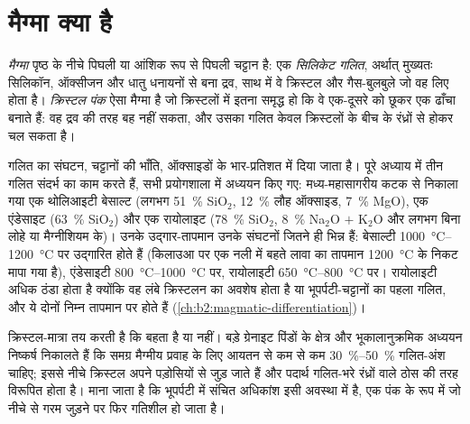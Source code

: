 \section{मैग्मा क्या है}

\begin{definition}[मैग्मा]\label{def:b2:magma-emplacement:magma}
\emph{मैग्मा} पृष्ठ के नीचे पिघली या आंशिक रूप से पिघली चट्टान है: एक
\emph{सिलिकेट गलित}, अर्थात् मुख्यतः सिलिकॉन,
ऑक्सीजन और धातु धनायनों से बना द्रव, साथ में वे क्रिस्टल और गैस-बुलबुले जो वह लिए होता है।
\emph{क्रिस्टल पंक} ऐसा मैग्मा है जो क्रिस्टलों में इतना समृद्ध हो कि वे
एक-दूसरे को छूकर एक ढाँचा बनाते हैं: वह द्रव की तरह बह नहीं सकता, और उसका गलित केवल
क्रिस्टलों के बीच के रंध्रों से होकर चल सकता है।
\end{definition}

गलित का संघटन, चट्टानों की भाँति, ऑक्साइडों के भार-प्रतिशत में दिया जाता है।
पूरे अध्याय में तीन गलित संदर्भ का काम करते हैं, सभी
प्रयोगशाला में अध्ययन किए गए: मध्य-महासागरीय कटक से निकाला गया एक थोलिआइटी बेसाल्ट
(लगभग \qty{51}{\percent} SiO$_2$, \qty{12}{\percent} लौह ऑक्साइड, \qty{7}{\percent}
MgO), एक एंडेसाइट (\qty{63}{\percent} SiO$_2$) और एक रायोलाइट (\qty{78}{\percent}
SiO$_2$, \qty{8}{\percent} Na$_2$O $+$ K$_2$O और लगभग बिना लोहे या मैग्नीशियम के)।
उनके उद्गार-तापमान उनके संघटनों जितने ही भिन्न हैं: बेसाल्टी
 \qtyrange{1000}{1200}{\celsius} पर उद्गारित होते हैं (किलाउआ पर एक नली में बहते लावा का तापमान
\qty{1200}{\celsius} के निकट मापा गया है), एंडेसाइटी 
\qtyrange{800}{1000}{\celsius} पर, रायोलाइटी  \qtyrange{650}{800}{\celsius} पर।
रायोलाइटी  अधिक ठंडा होता है क्योंकि वह लंबे क्रिस्टलन का अवशेष होता है
या भूपर्पटी-चट्टानों का पहला गलित, और ये दोनों निम्न तापमान पर होते हैं
(\cref{ch:b2:magmatic-differentiation})।

क्रिस्टल-मात्रा तय करती है कि  बहता है या नहीं। बड़े ग्रेनाइट पिंडों के क्षेत्र और
भूकालानुक्रमिक अध्ययन निष्कर्ष निकालते हैं कि समग्र मैग्मीय प्रवाह के लिए आयतन से कम से कम
\qtyrange{30}{50}{\percent} गलित-अंश चाहिए; इससे नीचे
क्रिस्टल अपने पड़ोसियों से जुड़ जाते हैं और पदार्थ गलित-भरे रंध्रों वाले ठोस की तरह
विरूपित होता है। माना जाता है कि भूपर्पटी में संचित अधिकांश 
इसी अवस्था में है, एक पंक के रूप में जो नीचे से गरम  जुड़ने पर फिर
गतिशील हो जाता है।

